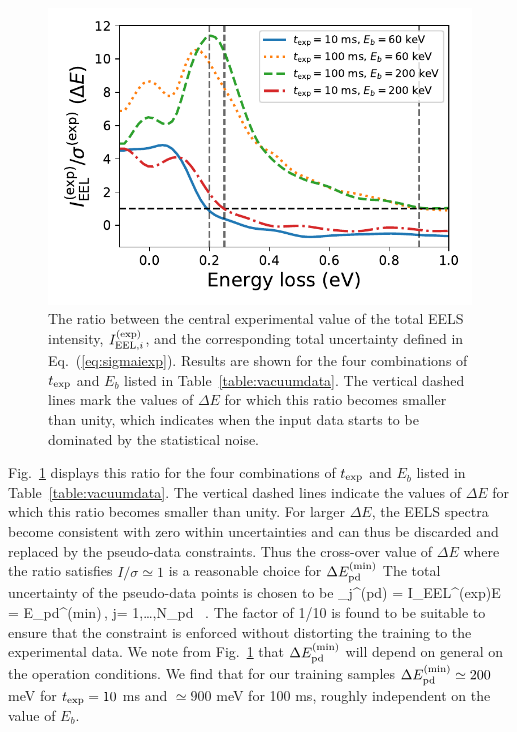       
\begin{figure}[H]
    \centering
    \includegraphics[width=120mm]{plots/intensity_to_error_ratio.pdf}
    \caption{The ratio between the central experimental value of the total
      EELS intensity, $I_{{\rm EEL},i}^{(\rm exp)}$, and the corresponding
      total uncertainty defined in Eq.~(\ref{eq:sigmaiexp}).
      Results are shown for the four combinations of $t_{\rm exp}$
      and $E_{b}$ listed in Table~\ref{table:vacuumdata}.
      The vertical dashed lines mark the values of $\Delta E$ for which
      this ratio becomes smaller than unity, which indicates when the input
      data starts to be dominated by the statistical noise.
      }
    \label{fig:intensityratio}
\end{figure}

Fig.~\ref{fig:intensityratio} displays this ratio
for the four combinations of $t_{\rm exp}$
and $E_{b}$ listed in Table~\ref{table:vacuumdata}.
%
The vertical dashed lines indicate the values of $\Delta E$ for which
this ratio becomes smaller than unity.
%
For larger $\Delta E$, the EELS spectra become
consistent with zero within uncertainties and can thus be discarded and replaced
by the pseudo-data constraints.
%
Thus the cross-over value of $\Delta E$  where the ratio satisfies $I/\sigma\simeq 1$
is a reasonable choice for $\Delta E_{\rm pd}^{\rm (min)}$
%
The total uncertainty of the pseudo-data points is chosen to be
\be
\sigma_j^{(\rm pd)} = I_{{\rm EEL}}^{\rm (exp)}\lp \Delta E = \Delta E_{\rm pd}^{\rm (min)}\rp \,, \quad 
j= 1,\ldots,N_{\rm pd} \, .
\ee
The factor of 1/10 is found to be suitable to ensure that the constraint
is enforced without distorting
the training to the experimental data.
%
We note from Fig.~\ref{fig:intensityratio} that $\Delta E_{\rm pd}^{\rm (min)}$ will
depend on general on the operation conditions.
%
We find that
for our training samples $\Delta E_{\rm pd}^{\rm (min)} \simeq 200$ meV for $t_{\rm exp}=10$ ms
and $\simeq  900$ meV for 100 ms, roughly independent on the value of $E_b$.

